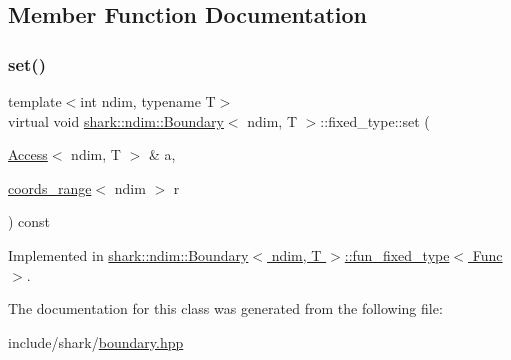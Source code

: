 \subsection{Member Function Documentation}
\hypertarget{classshark_1_1ndim_1_1_boundary_1_1fixed__type_ad94ec2994049c5107d0ea5d24bf8cff3}{}\label{classshark_1_1ndim_1_1_boundary_1_1fixed__type_ad94ec2994049c5107d0ea5d24bf8cff3} 
\subsubsection{\texorpdfstring{set()}{set()}}
{\footnotesize\ttfamily template$<$int ndim, typename T$>$ \\
virtual void \hyperlink{classshark_1_1ndim_1_1_boundary}{shark\+::ndim\+::\+Boundary}$<$ ndim, T $>$\+::fixed\+\_\+type\+::set (\begin{DoxyParamCaption}\item[{\hyperlink{classshark_1_1ndim_1_1_access}{Access}$<$ ndim, T $>$ \&}]{a,  }\item[{\hyperlink{structshark_1_1ndim_1_1coords__range}{coords\+\_\+range}$<$ ndim $>$}]{r }\end{DoxyParamCaption}) const\hspace{0.3cm}{\ttfamily [pure virtual]}}



Implemented in \hyperlink{classshark_1_1ndim_1_1_boundary_1_1fun__fixed__type_adc9d38ff40b75decf5790ad6f701f3ad}{shark\+::ndim\+::\+Boundary$<$ ndim, T $>$\+::fun\+\_\+fixed\+\_\+type$<$ Func $>$}.



The documentation for this class was generated from the following file\+:\begin{DoxyCompactItemize}
\item 
include/shark/\hyperlink{boundary_8hpp}{boundary.\+hpp}\end{DoxyCompactItemize}
